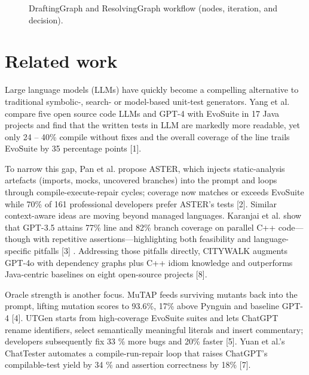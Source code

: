 \documentclass[conference]{IEEEtran}
\begin{document}
\begin{figure}
{}
\caption{DraftingGraph and ResolvingGraph workflow (nodes, iteration, and decision).}
\label{fig:multiagent_graph}
\end{figure}

\section{Related work}
Large language models (LLMs) have quickly become a compelling alternative to traditional symbolic-, search- or model-based unit-test generators. Yang et al. compare five open source code LLMs and GPT-4 with EvoSuite in 17 Java projects and find that the written tests in LLM are markedly more readable, yet only 24 – 40\% compile without fixes and the overall coverage of the line trails EvoSuite by 35 percentage points [1].  

To narrow this gap, Pan et al. propose ASTER, which injects static-analysis artefacts (imports, mocks, uncovered branches) into the prompt and loops through compile-execute-repair cycles; coverage now matches or exceeds EvoSuite while 70\% of 161 professional developers prefer ASTER’s tests [2]. Similar context-aware ideas are moving beyond managed languages. Karanjai et al. show that GPT-3.5 attains 77\% line and 82\% branch coverage on parallel C++ code—though with repetitive assertions—highlighting both feasibility and language-specific pitfalls [3] . Addressing those pitfalls directly, CITYWALK augments GPT-4o with dependency graphs plus C++ idiom knowledge and outperforms Java-centric baselines on eight open-source projects [8]. 

Oracle strength is another focus. MuTAP feeds surviving mutants back into the prompt, lifting mutation scores to 93.6\%, 17\% above Pynguin and baseline GPT-4 [4]. UTGen starts from high-coverage EvoSuite suites and lets ChatGPT rename identifiers, select semantically meaningful literals and insert commentary; developers subsequently fix 33 \% more bugs and 20\% faster [5]. Yuan et al.’s ChatTester automates a compile-run-repair loop that raises ChatGPT’s compilable-test yield by 34 \% and assertion correctness by 18\% [7]. 
\end{document}
